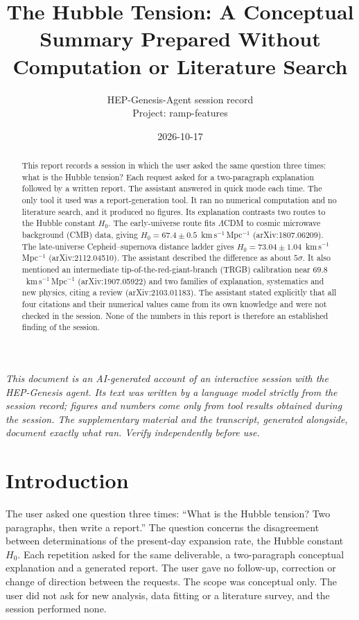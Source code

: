 \documentclass[11pt,a4paper]{article}
\title{The Hubble Tension: A Conceptual Summary Prepared Without Computation or Literature Search}
\author{HEP-Genesis-Agent session record \\ \small Project: ramp-features}
\date{2026-10-17}
\begin{document}
\maketitle
\noindent\textit{\small This document is an AI-generated account of an interactive session with the HEP-Genesis agent. Its text was written by a language model strictly from the session record; figures and numbers come only from tool results obtained during the session. The supplementary material and the transcript, generated alongside, document exactly what ran. Verify independently before use.}
\vspace{1em}

\begin{abstract}
This report records a session in which the user asked the same question three times: what is the Hubble tension? Each request asked for a two-paragraph explanation followed by a written report. The assistant answered in quick mode each time. The only tool it used was a report-generation tool. It ran no numerical computation and no literature search, and it produced no figures. Its explanation contrasts two routes to the Hubble constant $H_0$. The early-universe route fits $\Lambda$CDM to cosmic microwave background (CMB) data, giving $H_0 = 67.4 \pm 0.5$~km\,s$^{-1}$\,Mpc$^{-1}$ (arXiv:1807.06209). The late-universe Cepheid--supernova distance ladder gives $H_0 = 73.04 \pm 1.04$~km\,s$^{-1}$\,Mpc$^{-1}$ (arXiv:2112.04510). The assistant described the difference as about $5\sigma$. It also mentioned an intermediate tip-of-the-red-giant-branch (TRGB) calibration near $69.8$~km\,s$^{-1}$\,Mpc$^{-1}$ (arXiv:1907.05922) and two families of explanation, systematics and new physics, citing a review (arXiv:2103.01183). The assistant stated explicitly that all four citations and their numerical values came from its own knowledge and were not checked in the session. None of the numbers in this report is therefore an established finding of the session.
\end{abstract}

\section{Introduction}
The user asked one question three times: ``What is the Hubble tension? Two paragraphs, then write a report.'' The question concerns the disagreement between determinations of the present-day expansion rate, the Hubble constant $H_0$. Each repetition asked for the same deliverable, a two-paragraph conceptual explanation and a generated report. The user gave no follow-up, correction or change of direction between the requests. The scope was conceptual only. The user did not ask for new analysis, data fitting or a literature survey, and the session performed none.
\end{document}
